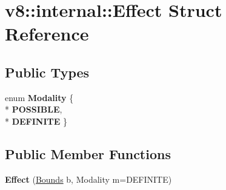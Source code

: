 \hypertarget{structv8_1_1internal_1_1_effect}{}\section{v8\+:\+:internal\+:\+:Effect Struct Reference}
\label{structv8_1_1internal_1_1_effect}
\subsection*{Public Types}
\begin{DoxyCompactItemize}
\item 
enum {\bfseries Modality} \{ \\*
{\bfseries P\+O\+S\+S\+I\+B\+LE}, 
\\*
{\bfseries D\+E\+F\+I\+N\+I\+TE}
 \}\hypertarget{structv8_1_1internal_1_1_effect_a7aef27ba32afed47786abc4e2256a4ca}{}\label{structv8_1_1internal_1_1_effect_a7aef27ba32afed47786abc4e2256a4ca}

\end{DoxyCompactItemize}
\subsection*{Public Member Functions}
\begin{DoxyCompactItemize}
\item 
{\bfseries Effect} (\hyperlink{structv8_1_1internal_1_1_bounds}{Bounds} b, Modality m=D\+E\+F\+I\+N\+I\+TE)\hypertarget{structv8_1_1internal_1_1_effect_a7fed26ff89a13353eae5d9cbdc15f76b}{}\label{structv8_1_1internal_1_1_effect_a7fed26ff89a13353eae5d9cbdc15f76b}

\end{DoxyCompactItemize}

